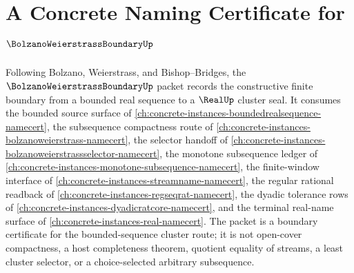 \chapter{A Concrete Naming Certificate for $\BolzanoWeierstrassBoundaryUp$}
\label{ch:concrete-instances-bolzano-weierstrass-boundary-namecert}

Following Bolzano, Weierstrass, and Bishop--Bridges, the $\BolzanoWeierstrassBoundaryUp$ packet records the constructive finite boundary from a bounded real sequence to a $\RealUp$ cluster seal. It consumes the bounded source surface of \autoref{ch:concrete-instances-boundedrealsequence-namecert}, the subsequence compactness route of \autoref{ch:concrete-instances-bolzanoweierstrass-namecert}, the selector handoff of \autoref{ch:concrete-instances-bolzanoweierstrassselector-namecert}, the monotone subsequence ledger of \autoref{ch:concrete-instances-monotone-subsequence-namecert}, the finite-window interface of \autoref{ch:concrete-instances-streamname-namecert}, the regular rational readback of \autoref{ch:concrete-instances-regseqrat-namecert}, the dyadic tolerance rows of \autoref{ch:concrete-instances-dyadicratcore-namecert}, and the terminal real-name surface of \autoref{ch:concrete-instances-real-namecert}. The packet is a boundary certificate for the bounded-sequence cluster route; it is not open-cover compactness, a host completeness theorem, quotient equality of streams, a least cluster selector, or a choice-selected arbitrary subsequence.

